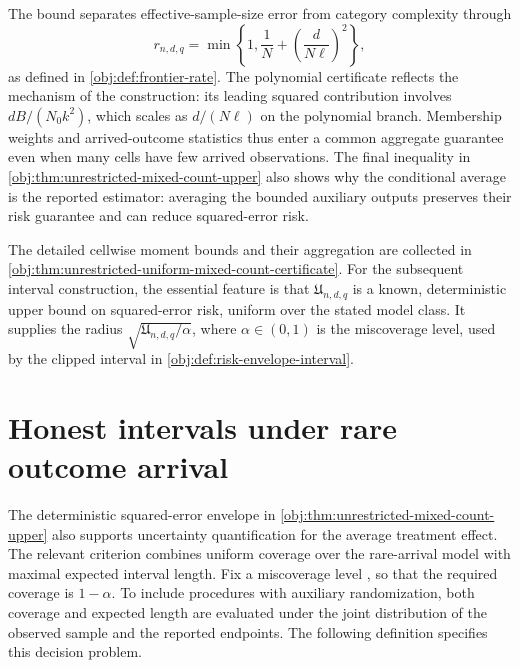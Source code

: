 \documentclass[11pt]{article}
\begin{document}
The bound separates effective-sample-size error from category complexity through
\[
r_{n,d,q}
=\min\left\{1,\frac1N+
\left(\frac{d}{N\ell}\right)^2\right\},
\]
as defined in \cref{obj:def:frontier-rate}. The polynomial certificate reflects the mechanism of the construction: its leading squared contribution involves \(dB/(N_0k^2)\), which scales as \(d/(N\ell)\) on the polynomial branch. Membership weights and arrived-outcome statistics thus enter a common aggregate guarantee even when many cells have few arrived observations. The final inequality in \cref{obj:thm:unrestricted-mixed-count-upper} also shows why the conditional average is the reported estimator: averaging the bounded auxiliary outputs preserves their risk guarantee and can reduce squared-error risk.

The detailed cellwise moment bounds and their aggregation are collected in \cref{obj:thm:unrestricted-uniform-mixed-count-certificate}. For the subsequent interval construction, the essential feature is that \(\mathfrak U_{n,d,q}\) is a known, deterministic upper bound on squared-error risk, uniform over the stated model class. It supplies the radius \(\sqrt{\mathfrak U_{n,d,q}/\alpha}\), where \(\alpha\in(0,1)\) is the miscoverage level, used by the clipped interval in \cref{obj:def:risk-envelope-interval}.


\section{Honest intervals under rare outcome arrival}

The deterministic squared-error envelope in \cref{obj:thm:unrestricted-mixed-count-upper} also supports uncertainty quantification for the average treatment effect. The relevant criterion combines uniform coverage over the rare-arrival model with maximal expected interval length. Fix a miscoverage level , so that the required coverage is \(1-\alpha\). To include procedures with auxiliary randomization, both coverage and expected length are evaluated under the joint distribution of the observed sample and the reported endpoints. The following definition specifies this decision problem.
\end{document}
